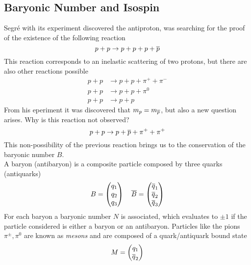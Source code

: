\documentclass[../qm.tex]{subfiles}
\begin{document}
\subsection{Baryonic Number and Isospin}
Segré with its experiment discovered the antiproton, was searching for the proof of the existence of the following reaction
\begin{equation}
	p+p\to p+p+p+\overline{p}
	\label{eq:antiprotonsegre}
\end{equation}
This reaction corresponds to an inelastic scattering of two protons, but there are also other reactions possible
\begin{equation*}
	\begin{aligned}
		p+p&\to p+p+\pi^++\pi^-\\
		p+p&\to p+p+\pi^0\\
		p+p&\to p+p
	\end{aligned}
\end{equation*}
From his eperiment it was discovered that $m_p=m_{\overline{p}}$, but also a new question arises. Why is this reaction not observed?
\begin{equation*}
	p+p\to p+\overline{p}+\pi^++\pi^+
\end{equation*}
This non-possibility of the previous reaction brings us to the conservation of the baryonic number $B$.\\
A baryon (antibaryon) is a composite particle composed by three quarks (antiquarks)
\begin{equation}
	B=\begin{pmatrix}
		q_1\\q_2\\q_3
	\end{pmatrix}\quad\overline{B}=\begin{pmatrix}
		\overline{q}_1\\\overline{q}_2\\\overline{q}_3
	\end{pmatrix}
	\label{eq:baryonantibarion}
\end{equation}
For each baryon a baryonic number $N$ is associated, which evaluates to $\pm1$ if the particle considered is either a baryon or an antibaryon. Particles like the pions $\pi^\pm,\pi^0$ are known as \emph{mesons} and are composed of a quark/antiquark bound state
\begin{equation}
	M=\begin{pmatrix}
		q_1\\\overline{q}_2
	\end{pmatrix}
	\label{eq:mesonqq}
\end{equation}
\end{document}
